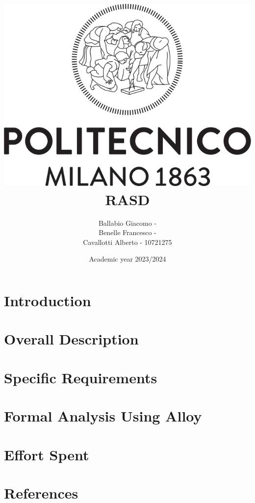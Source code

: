 \documentclass{article}
\title{
\includegraphics[scale=0.5]{Logo_Politecnico_Milano.png}\\ [\bigskipamount]
\vspace{1 cm}
\Huge RASD}
\author{Ballabio Giacomo - \\ Benelle Francesco - \\ Cavallotti Alberto - 10721275}
\date{Academic year 2023/2024}
\begin{document}
\maketitle
\tableofcontents

\pagebreak

    \mainmatter %


    \chapter{Introduction}
    \label{ch:introduction}%
    


    \chapter{Overall Description}
    \label{ch:overall_description}%
    


    \chapter{Specific Requirements}
    \label{ch:specific_requirements}%
    


    \chapter{Formal Analysis Using Alloy}
    \label{ch:formal_analysis_using_alloy}%
    


    \chapter{Effort Spent}
    \label{ch:effort_spent}%
    


    \chapter{References}
    \label{ch:references}%
    

    \listoffigures

    \listoftables
    \cleardoublepage
\end{document}
